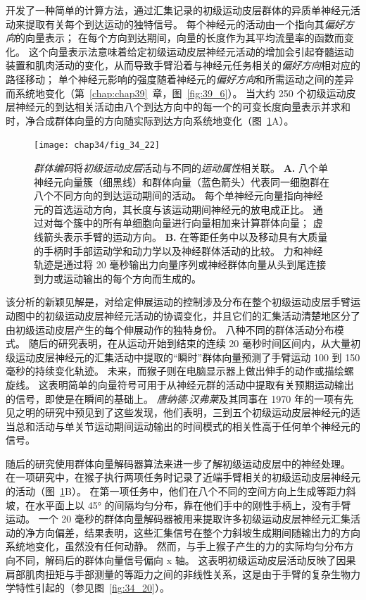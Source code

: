 开发了一种简单的计算方法，通过汇集记录的初级运动皮层群体的异质单神经元活动来提取有关每个到达运动的独特信号。
每个神经元的活动由一个指向其\textit{偏好方向}的向量表示；
在每个方向到达期间，向量的长度作为其平均流量率的函数而变化。
这个向量表示法意味着给定初级运动皮层神经元活动的增加会引起脊髓运动装置和肌肉活动的变化，从而导致手臂沿着与神经元任务相关的\textit{偏好方向}相对应的路径移动；
单个神经元影响的强度随着神经元的\textit{偏好方向}和所需运动之间的差异而系统地变化（第~\ref{chap:chap39}~章，图~\ref{fig:39_6}）。
当大约 250 个初级运动皮层神经元的到达相关活动由八个到达方向中的每一个的可变长度向量表示并求和时，净合成群体向量的方向随实际到达方向系统地变化（图~\ref{fig:34_22}A）。


\begin{figure}[htbp]
	\centering
	\texttt{[image: chap34/fig\_34\_22]}
	\caption{\textit{群体编码}将\textit{初级运动皮层}活动与不同的\textit{运动属性}相关联。
		\textbf{A.} 八个单神经元向量簇（细黑线）和群体向量（蓝色箭头）代表同一细胞群在八个不同方向的到达运动期间的活动。
		每个单神经元向量指向神经元的首选运动方向，其长度与该运动期间神经元的放电成正比。
		通过对每个簇中的所有单细胞向量进行向量相加来计算群体向量；
		虚线箭头表示手臂的运动方向\cite{georgopoulos1983spatial}。
		\textbf{B.} 在等距任务中以及移动具有大质量的手柄时手部运动学和动力学以及神经群体活动的比较。
		力和神经轨迹是通过将 20 毫秒输出力向量序列或神经群体向量从头到尾连接到力或运动输出的每个方向而生成的。}
	\label{fig:34_22}
\end{figure}


该分析的新颖见解是，对给定伸展运动的控制涉及分布在整个初级运动皮层手臂运动图中的初级运动皮层神经元活动的协调变化，并且它们的汇集活动清楚地区分了由初级运动皮层产生的每个伸展动作的独特身份。
八种不同的群体活动分布模式。
随后的研究表明，在从运动开始到结束的连续 20 毫秒时间区间内，从大量初级运动皮层神经元的汇集活动中提取的“瞬时”群体向量预测了手臂运动 100 到 150 毫秒的持续变化轨迹。
未来，而猴子则在电脑显示器上做出伸手的动作或描绘螺旋线。
这表明简单的向量符号可用于从神经元群的活动中提取有关预期运动输出的信号，即使是在瞬间的基础上。
\textit{唐纳德$\cdot$汉弗莱}及其同事在 1970 年的一项有先见之明的研究中预见到了这些发现，他们表明，三到五个初级运动皮层神经元的适当总和活动与单关节运动期间运动输出的时间模式的相关性高于任何单个神经元的信号。


随后的研究使用群体向量解码器算法来进一步了解初级运动皮层中的神经处理。
在一项研究中，在猴子执行两项任务时记录了近端手臂相关的初级运动皮层神经元的活动（图~\ref{fig:34_22}B）。
在第一项任务中，他们在八个不同的空间方向上生成等距力斜坡，在水平面上以 45° 的间隔均匀分布，靠在他们手中的刚性手柄上，没有手臂运动。
一个 20 毫秒的群体向量解码器被用来提取许多初级运动皮层神经元汇集活动的净方向偏差，结果表明，这些汇集信号在整个力斜坡生成期间随输出力的方向系统地变化，虽然没有任何动静。
然而，与手上猴子产生的力的实际均匀分布方向不同，解码后的群体向量信号偏向 x 轴。
这表明初级运动皮层活动反映了因果肩部肌肉扭矩与手部测量的等距力之间的非线性关系，这是由于手臂的复杂生物力学特性引起的（参见图~\ref{fig:34_20}）。


